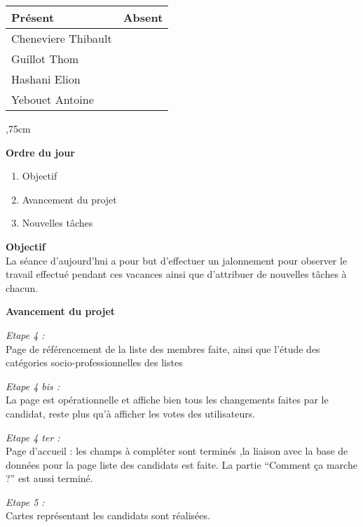 \vskip 0.75cm

\begin{center}
\begin{tabular}[]{|l|l|}
     \hline 
     Présent & Absent\\
     \hline
     Cheneviere Thibault &\\ Guillot Thom & \\
     Hashani Elion &\\ Yebouet Antoine &\\
     \hline
\end{tabular}
\end{center}

,75cm

\noindent
\textbf{Ordre du jour}

\begin{enumerate}
    \item Objectif
    \item Avancement du projet
    \item Nouvelles tâches
\end{enumerate}

\vskip 0.25cm

\noindent
\textbf{Objectif}\\
\noindent
La séance d'aujourd'hui a pour but d'effectuer un jalonnement pour observer le travail effectué pendant ces vacances ainsi que d'attribuer de nouvelles tâches à chacun.

\vskip 0.25cm

\noindent
\textbf{Avancement du projet}

\noindent
\textit{Etape 4 :}\\
Page de référencement de la liste des membres faite, ainsi que l’étude des catégories socio-professionnelles des listes

\vskip 0.25cm

\noindent
\textit{Etape 4 bis :}\\
La page est opérationnelle et affiche bien tous les changements faites par le candidat, reste plus qu’à afficher les votes des utilisateurs.

\vskip 0.25cm

\noindent
\textit{Etape 4 ter :}\\
Page d’accueil : les champs à compléter sont terminés ,la liaison avec la base de données pour la page liste des candidats est faite. La partie “Comment ça marche ?” est aussi terminé.

\vskip 0.25cm

\noindent
\textit{Etape 5 :}\\
Cartes représentant les candidats sont réalisées.


